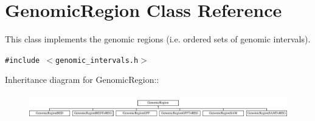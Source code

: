 \hypertarget{classGenomicRegion}{
\section{GenomicRegion Class Reference}
\label{classGenomicRegion}
}
This class implements the genomic regions (i.e. ordered sets of genomic intervals).  


{\tt \#include $<$genomic\_\-intervals.h$>$}

Inheritance diagram for GenomicRegion::\begin{figure}[H]
\begin{center}
\leavevmode
\includegraphics[height=1.06667cm]{classGenomicRegion}
\end{center}
\end{figure}
